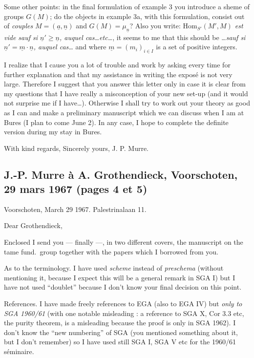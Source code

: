 \documentclass[11pt,a4paper]{article}
\begin{document}
Some other points: in the final formulation of example 3 you introduce a sheme
of groups $G(M)$;  do the objects in example 3a,
with this formulation, consist out of \emph{couples} $M=(\underline{a},
\underline{n})$ and $G(M) = \mu_{\underline{n}}$? Also you write:
\emph{$\mathrm{Hom}_{S'}(M',M)$ est vide sauf si $\underline{n}' \geqslant
\underline{n}$, auquel cas…etc…}, it seems to me that this should be
…\emph{sauf si $\underline{n}' = \underline{m}\cdot\underline{n}$, auquel
cas…} and where $\underline{m} = (m_i)_{i \in I}$ is a set of positive
integers.

I realize that I cause you a lot of trouble and work by asking every time for
further explanation and that my assistance in writing the exposé is not very
large. Therefore I suggest that you answer this letter only in case it is clear
from my questions that I have really a misconception of your new set-up (and it
would not surprise me if I have…). Otherwise I shall try to work out your
theory as good as I can and make a preliminary manuscript which we can discuss
when I am at Bures (I plan to come June 2). In any case, I hope to complete the
definite version during my stay in Bures.

With kind regards, Sincerely yours, J. P. Murre.

\subsection*{J.-P. Murre à A. Grothendieck, Voorschoten, 29 mars 1967 (pages 4 et 5)}

Voorschoten, March 29 1967. Palestrinalaan 11.

Dear Grothendieck,

Enclosed I send you --- finally ---, in two different covers, the manuscript on
the tame fund.\ group together with the papers which I borrowed from you.

As to the terminology. I have used \emph{scheme} instead of \emph{preschema}
(without mentioning it, because I expect this will be a general remark in
SGA I) but I have not used ``doublet'' because I don't know your final decision
on this point.

References. I have made freely references to EGA (also to EGA IV) but
\emph{only to} \emph{SGA 1960/61} (with one notable misleading : a reference to
SGA X, Cor 3.3 etc, the purity theorem, is a misleading because the proof is
only in SGA 1962). I don't know the ``new numbering'' of SGA (you mentioned
something about it, but I don't remember) so I have used still SGA I, SGA V etc
for the 1960/61 séminaire.
\end{document}

